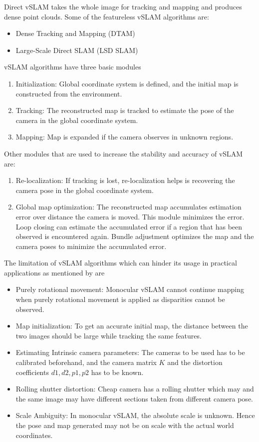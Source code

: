 Direct vSLAM takes the whole image for tracking and mapping and produces dense point clouds. Some of the featureless vSLAM algorithms are:

\begin{itemize}
	\item Dense Tracking and Mapping (DTAM) \cite{6126513}
	\item Large-Scale Direct SLAM (LSD SLAM) \cite{Engel2014LSDSLAMLD}
\end{itemize}

vSLAM algorithms have three basic modules 
\begin{enumerate}
	\item Initialization: Global coordinate system is defined, and the initial map is constructed from the environment.
	\item Tracking: The reconstructed map is tracked to estimate the pose of the camera in the global coordinate system.
	\item Mapping: Map is expanded if the camera observes in unknown regions.
\end{enumerate}

Other modules that are used to increase the stability and accuracy of vSLAM are:
\begin{enumerate}
	\item Re-localization: If tracking is lost, re-localization helps is recovering the camera pose in the global coordinate system.
	\item Global map optimization: The reconstructed map accumulates estimation error over distance the camera is moved. This module minimizes the error. Loop closing can estimate the accumulated error if a region that has been observed is encountered again. Bundle adjustment optimizes the map and the camera poses to minimize the accumulated error.
\end{enumerate}


The limitation of vSLAM algorithms which can hinder its usage in practical applications as mentioned by  are

\begin{itemize}
	\item Purely rotational movement: Monocular vSLAM cannot continue mapping when purely rotational movement is applied as disparities cannot be observed.
	\item Map initialization: To get an accurate initial map, the distance between the two images should be large while tracking the same features. 
	\item Estimating Intrinsic camera parameters: The cameras to be used has to be calibrated beforehand, and the  camera matrix $K$ and the distortion coefficients $d1, d2, p1, p2$ has to be known.
	\item Rolling shutter distortion: Cheap camera has a rolling shutter which may and the same image may have different sections taken from different camera pose.
	\item Scale Ambiguity: In monocular vSLAM, the absolute scale is unknown. Hence the pose and map generated may not be on scale with the actual world coordinates.
\end{itemize}




